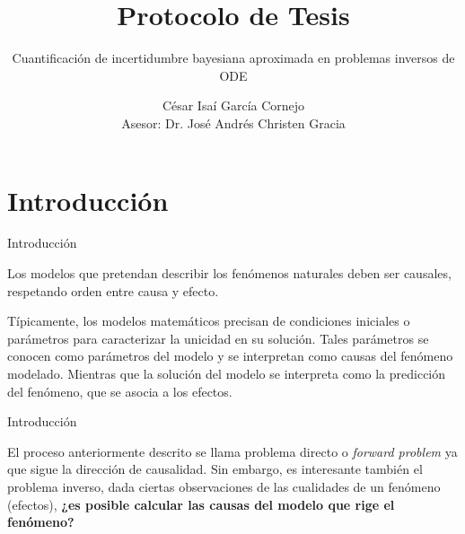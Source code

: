 \documentclass[10pt,aspectratio=169]{beamer}
\title{Protocolo de Tesis}
\subtitle{Cuantificación de incertidumbre bayesiana aproximada en problemas inversos de ODE}
\date{}
\author{César Isaí García Cornejo\\
Asesor: Dr. José Andrés Christen Gracia}
\institute{CIMAT}
\begin{document}
\maketitle


\section[Introducción]{Introducción}

\begin{frame}[fragile]{Introducción}
  
  Los modelos que pretendan describir los fenómenos naturales deben ser causales, respetando orden entre causa y efecto.

  Típicamente, los modelos matemáticos precisan de condiciones iniciales o parámetros  para caracterizar la unicidad en su solución. Tales parámetros se conocen como parámetros del modelo y se interpretan como causas del fenómeno modelado. Mientras que la solución del modelo se interpreta como la predicción del fenómeno, que se asocia a los efectos.
  
\end{frame}


\begin{frame}[fragile]{Introducción}
  
  El proceso anteriormente descrito se llama problema directo o \textit{forward problem} ya que sigue la dirección de causalidad. Sin embargo, es interesante también el problema inverso, dada ciertas observaciones de las cualidades de un fenómeno (efectos), \textbf{¿es posible calcular las causas del modelo que rige el fenómeno?}


\end{frame}
\end{document}
